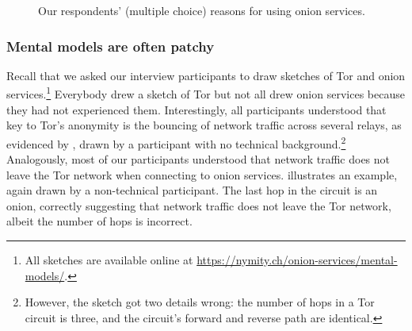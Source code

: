 \begin{figure}[t]
    \centering
    
    \caption{Our respondents' (multiple choice) reasons for using onion
    services.}
    \label{fig:onion-usage}
\end{figure}

\subsubsection{Mental models are often patchy}
\label{sec:mental-models}

Recall that we asked our interview participants to draw sketches of Tor and
onion services.\footnote{All sketches are available online at
\url{https://nymity.ch/onion-services/mental-models/}.}  Everybody drew a
sketch of Tor but not all drew onion services because they had not experienced
them.  Interestingly, all participants understood that key to Tor's anonymity is
the bouncing of network traffic across several relays, as evidenced by
, drawn by a participant with no technical
background.\footnote{However, the sketch got two details wrong: the number of
hops in a Tor circuit is three, and the circuit's forward and reverse path are
identical.} Analogously, most of our participants understood that network
traffic does not leave the Tor network when connecting to onion services.
 illustrates an example, again drawn by a non-technical
participant.  The last hop in the circuit is an onion, correctly suggesting that
network traffic does not leave the Tor network, albeit the number of hops is
incorrect.


